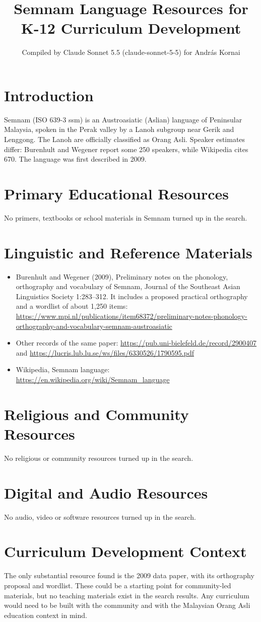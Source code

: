 \documentclass[12pt]{article}
\title{Semnam Language Resources for K-12 Curriculum Development}
\author{Compiled by Claude Sonnet 5.5 (claude-sonnet-5-5) for Andr\'as Kornai}
\date{}
\begin{document}
\maketitle

\section{Introduction}
Semnam (ISO 639-3 ssm) is an Austroasiatic (Aslian) language of Peninsular Malaysia, spoken in the Perak valley by a Lanoh subgroup near Gerik and Lenggong. The Lanoh are officially classified as Orang Asli. Speaker estimates differ: Burenhult and Wegener report some 250 speakers, while Wikipedia cites 670. The language was first described in 2009.

\section{Primary Educational Resources}
No primers, textbooks or school materials in Semnam turned up in the search.

\section{Linguistic and Reference Materials}
\begin{itemize}
\item Burenhult and Wegener (2009), Preliminary notes on the phonology, orthography and vocabulary of Semnam, Journal of the Southeast Asian Linguistics Society 1:283--312. It includes a proposed practical orthography and a wordlist of about 1,250 items: \url{https://www.mpi.nl/publications/item68372/preliminary-notes-phonology-orthography-and-vocabulary-semnam-austroasiatic}
\item Other records of the same paper: \url{https://pub.uni-bielefeld.de/record/2900407} and \url{https://lucris.lub.lu.se/ws/files/6330526/1790595.pdf}
\item Wikipedia, Semnam language: \url{https://en.wikipedia.org/wiki/Semnam_language}
\end{itemize}

\section{Religious and Community Resources}
No religious or community resources turned up in the search.

\section{Digital and Audio Resources}
No audio, video or software resources turned up in the search.

\section{Curriculum Development Context}
The only substantial resource found is the 2009 data paper, with its orthography proposal and wordlist. These could be a starting point for community-led materials, but no teaching materials exist in the search results. Any curriculum would need to be built with the community and with the Malaysian Orang Asli education context in mind.
\end{document}
